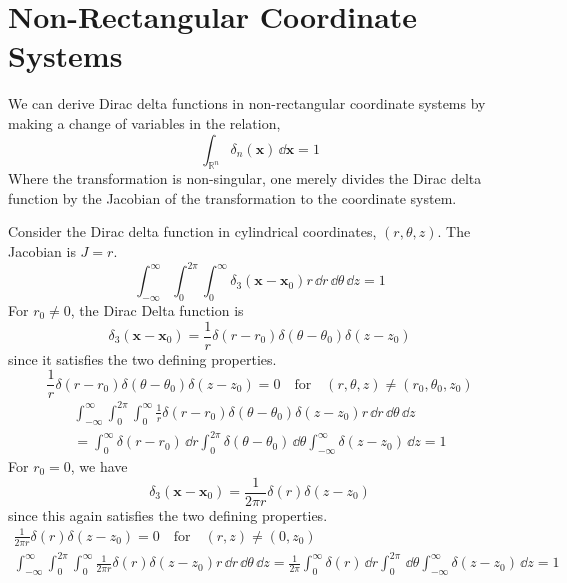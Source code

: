 \section{Non-Rectangular Coordinate Systems}




We can derive Dirac delta functions in non-rectangular coordinate systems
by making a change of variables in the relation,
\[
\int_{\mathbb{R}^n} \delta_n(\mathbf{x}) \,\dd \mathbf{x} = 1
\]
Where the transformation is non-singular, one merely divides the Dirac 
delta function by the Jacobian of the transformation to the coordinate system.




\begin{Example}
  Consider the Dirac delta function in cylindrical coordinates, $(r, \theta, z)$.
  The Jacobian is $J = r$.
  \[
  \int_{-\infty}^\infty \int_0^{2 \pi} \int_0^\infty \delta_3 \left( \mathbf{x} - \mathbf{x}_0 \right) 
  r \,\dd r \,\dd \theta \,\dd z = 1
  \]
  For $r_0 \neq 0$, the Dirac Delta function is
  \[
  \delta_3 \left( \mathbf{x} - \mathbf{x}_0 \right) 
  = \frac{1}{r} \delta \left( r - r_0 \right) \delta \left( \theta - \theta_0 \right)
  \delta \left( z - z_0 \right)
  \]
  since it satisfies the two defining properties.
  \[
  \frac{1}{r} \delta \left( r - r_0 \right) \delta \left( \theta - \theta_0 \right)
  \delta \left( z - z_0 \right) = 0 
  \quad \mathrm{for} \quad ( r, \theta, z ) \neq \left( r_0, \theta_0, z_0 \right)
  \]
  \begin{multline*}
    \int_{-\infty}^\infty \int_0^{2 \pi} \int_0^\infty \frac{1}{r} \delta \left( r - r_0 \right) \delta \left( \theta - \theta_0 \right)
    \delta \left( z - z_0 \right) r \,\dd r \,\dd \theta \,\dd z
    \\
    = \int_0^\infty \delta \left( r - r_0 \right) \,\dd r 
    \int_0^{2 \pi} \delta \left( \theta - \theta_0 \right) \,\dd \theta 
    \int_{-\infty}^\infty \delta \left( z - z_0 \right) \,\dd z = 1
  \end{multline*}
  For $r_0 = 0$, we have
  \[
  \delta_3 \left( \mathbf{x} - \mathbf{x}_0 \right) 
  = \frac{1}{2 \pi r} \delta \left( r \right) \delta \left( z - z_0 \right)
  \]
  since this again satisfies the two defining properties.
  \begin{gather*}
    \frac{1}{2 \pi r} \delta \left( r \right)
    \delta \left( z - z_0 \right) = 0 
    \quad \mathrm{for} \quad ( r, z ) \neq \left( 0, z_0 \right)
    \\
    \int_{-\infty}^\infty \int_0^{2 \pi} \int_0^\infty \frac{1}{2 \pi r} \delta \left( r \right) 
    \delta \left( z - z_0 \right) r \,\dd r \,\dd \theta \,\dd z
    = \frac{1}{2 \pi} \int_0^\infty \delta \left( r \right) \,\dd r 
    \int_0^{2 \pi} \,\dd \theta 
    \int_{-\infty}^\infty \delta \left( z - z_0 \right) \,\dd z = 1
  \end{gather*}
\end{Example}












